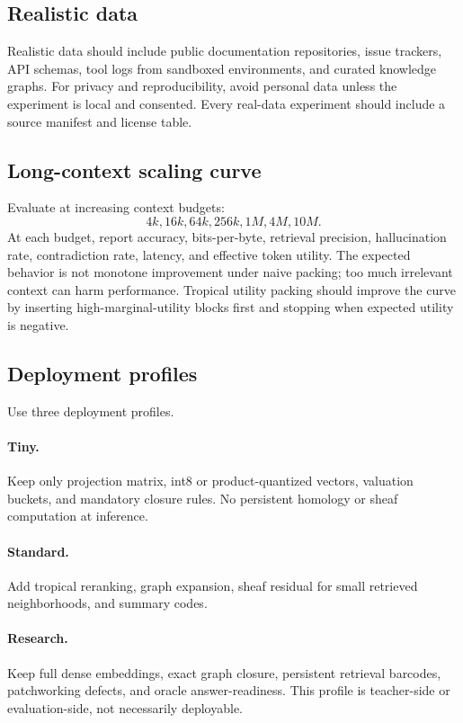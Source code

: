 \documentclass[11pt]{article}
\theoremstyle{definition}
\theoremstyle{remark}
\begin{document}
\subsection{Realistic data}

Realistic data should include public documentation repositories, issue trackers, API schemas, tool logs from sandboxed environments, and curated knowledge graphs. For privacy and reproducibility, avoid personal data unless the experiment is local and consented. Every real-data experiment should include a source manifest and license table.

\subsection{Long-context scaling curve}

Evaluate at increasing context budgets:
\[
    4k, 16k, 64k, 256k, 1M, 4M, 10M.
\]
At each budget, report accuracy, bits-per-byte, retrieval precision, hallucination rate, contradiction rate, latency, and effective token utility. The expected behavior is not monotone improvement under naive packing; too much irrelevant context can harm performance. Tropical utility packing should improve the curve by inserting high-marginal-utility blocks first and stopping when expected utility is negative.

\subsection{Deployment profiles}

Use three deployment profiles.
\paragraph{Tiny.} Keep only projection matrix, int8 or product-quantized vectors, valuation buckets, and mandatory closure rules. No persistent homology or sheaf computation at inference.
\paragraph{Standard.} Add tropical reranking, graph expansion, sheaf residual for small retrieved neighborhoods, and summary codes.
\paragraph{Research.} Keep full dense embeddings, exact graph closure, persistent retrieval barcodes, patchworking defects, and oracle answer-readiness. This profile is teacher-side or evaluation-side, not necessarily deployable.
\end{document}
